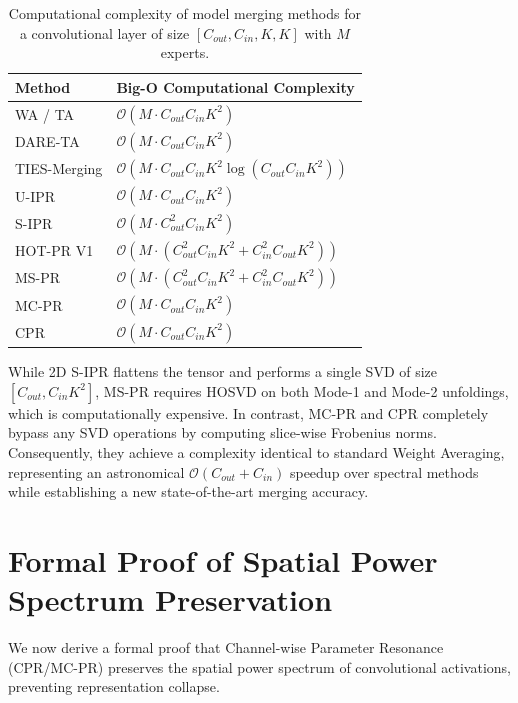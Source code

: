 \documentclass{article}
\theoremstyle{plain}
\theoremstyle{definition}
\theoremstyle{remark}
\begin{document}
\begin{table}[h]
\caption{Computational complexity of model merging methods for a convolutional layer of size $[C_{out}, C_{in}, K, K]$ with $M$ experts.}
\label{tab:complexity}
\vskip 0.1in
\begin{center}
\begin{small}
\begin{sc}
\begin{tabular}{ll}
\toprule
Method & Big-O Computational Complexity \\
\midrule
WA / TA & $\mathcal{O}(M \cdot C_{out} C_{in} K^2)$ \\
DARE-TA & $\mathcal{O}(M \cdot C_{out} C_{in} K^2)$ \\
TIES-Merging & $\mathcal{O}(M \cdot C_{out} C_{in} K^2 \log(C_{out} C_{in} K^2))$ \\
U-IPR & $\mathcal{O}(M \cdot C_{out} C_{in} K^2)$ \\
S-IPR & $\mathcal{O}(M \cdot C_{out}^2 C_{in} K^2)$ \\
\midrule
HOT-PR V1 & $\mathcal{O}(M \cdot (C_{out}^2 C_{in} K^2 + C_{in}^2 C_{out} K^2))$ \\
MS-PR & $\mathcal{O}(M \cdot (C_{out}^2 C_{in} K^2 + C_{in}^2 C_{out} K^2))$ \\
MC-PR & $\mathcal{O}(M \cdot C_{out} C_{in} K^2)$ \\
CPR & $\mathcal{O}(M \cdot C_{out} C_{in} K^2)$ \\
\bottomrule
\end{tabular}
\end{sc}
\end{small}
\end{center}
\vskip -0.1in
\end{table}

While 2D S-IPR flattens the tensor and performs a single SVD of size $[C_{out}, C_{in} K^2]$, MS-PR requires HOSVD on both Mode-1 and Mode-2 unfoldings, which is computationally expensive.
In contrast, MC-PR and CPR completely bypass any SVD operations by computing slice-wise Frobenius norms. Consequently, they achieve a complexity identical to standard Weight Averaging, representing an astronomical $\mathcal{O}(C_{out} + C_{in})$ speedup over spectral methods while establishing a new state-of-the-art merging accuracy.

\section{Formal Proof of Spatial Power Spectrum Preservation}
We now derive a formal proof that Channel-wise Parameter Resonance (CPR/MC-PR) preserves the spatial power spectrum of convolutional activations, preventing representation collapse.
\end{document}
